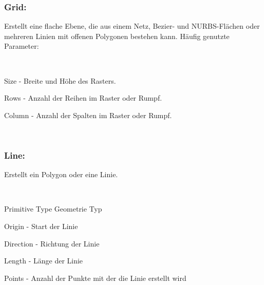 \subsubsection*{​Grid:}
Erstellt eine flache Ebene, die aus einem Netz, Bezier- und NURBS-Flächen oder mehreren Linien mit offenen Polygonen bestehen kann. Häufig genutzte Parameter:
\begin{​itemize}​
\item Size - Breite und Höhe des Rasters.
\item Rows - Anzahl der Reihen im Raster oder Rumpf.
\item Column - Anzahl der Spalten im Raster oder Rumpf.
\end{​itemize}​

\subsubsection*{​Line:}
Erstellt ein Polygon oder eine Linie.
\begin{​itemize}​
\item Primitive Type	Geometrie Typ  
\item Origin - Start der Linie
\item Direction - Richtung der Linie
\item Length	- Länge der Linie
\item Points	- Anzahl der Punkte mit der die Linie erstellt wird
\end{​itemize}​

